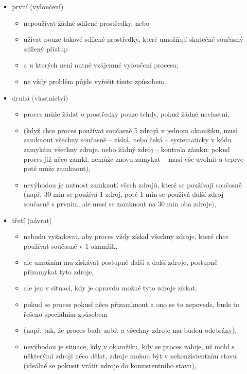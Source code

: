 \documentclass[a4paper, 11pt]{article}
\begin{document}
\begin{itemize}
    \item první (vyloučení)
    \begin{itemize}
        \item nepoužívat žádné sdílené prostředky, nebo 
        \item užívat pouze takové sdílené prostředky, které umožňují skutečně současný sdílený přístup
        \item a u kterých není nutné vzájemné vyloučení procesu;
        \item ne vždy problém půjde vyřešit tímto způsobem.
    \end{itemize}
    
    \item druhá (vlastnictví)
    \begin{itemize}
        \item proces může žádat o prostředky pouze tehdy, pokud žádné nevlastní,
        \item (když chce proces používat současně 5 zdrojů v jednom okamžiku, musí zamknout všechny současně -- získá, nebo čeká -- systematicky v kódu zamykám všechny zdroje, nebo žádný zdroj -- kontrola zámku: pokud proces již něco zamkl, nemůže znovu zamykat -- musí vše uvolnit a teprve poté může zamknout),
        \item nevýhodou je nutnost zamknutí všech zdrojů, které se používají současně (např. 30 min se používá 1 zdroj, poté 1 min se používá další zdroj současně s prvním, ale musí se zamknout na 30 min oba zdroje),
    \end{itemize}
    
    \item třetí (návrat)
    \begin{itemize}
        \item nebudu vyžadovat, aby proces vždy získal všechny zdroje, které chce používat současně v 1 okamžik,
        \item ale umožním mu získávat postupně další a další zdroje, postupně přizamykat tyto zdroje,
        \item ale jen v situaci, kdy je opravdu možné tyto zdroje získat,
        \item pokud se proces pokusí něco přizamknout a ono se to nepovede, bude to řešeno speciálním způsobem
        \item (např. tak, že proces bude zabit a všechny zdroje mu budou odebrány),
        \item nevýhodou je situace, kdy v okamžiku, kdy se proces zabije, už mohl s některými zdroji něco dělat, zdroje mohou být v nekonzistentním stavu (ideálně se pokusit vrátit zdroje do konzistentního stavu),
    \end{itemize}
    

\end{itemize}
\end{document}
